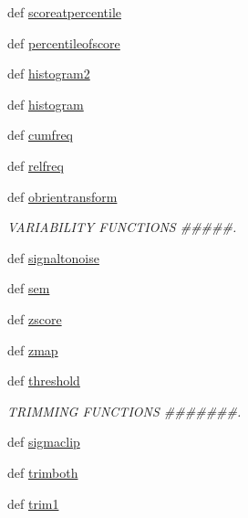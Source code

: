 \begin{DoxyCompactItemize}
def \hyperlink{namespacescipy_1_1stats_1_1stats_a72a6f95981ff8c462388584ecbf1fdb3}{scoreatpercentile}
\item 
def \hyperlink{namespacescipy_1_1stats_1_1stats_a5bfdda61db9243c3bbfea7bead760155}{percentileofscore}
\item 
def \hyperlink{namespacescipy_1_1stats_1_1stats_a8a1c376b310589575a9ff49c01dd573e}{histogram2}
\item 
def \hyperlink{namespacescipy_1_1stats_1_1stats_ad7bf370c4741b90596c8cecb021f2700}{histogram}
\item 
def \hyperlink{namespacescipy_1_1stats_1_1stats_a4fa11e21b0bc19cae7fc92d8a4960462}{cumfreq}
\item 
def \hyperlink{namespacescipy_1_1stats_1_1stats_a651c9a0a2dd7ea81ee73daf3bda40fde}{relfreq}
\item 
def \hyperlink{namespacescipy_1_1stats_1_1stats_a1bd45b2af0f91d4eb96626caf14d2ea3}{obrientransform}
\begin{DoxyCompactList}\small\item\em V\+A\+R\+I\+A\+B\+I\+L\+I\+T\+Y F\+U\+N\+C\+T\+I\+O\+N\+S \#\#\#\#\#. \end{DoxyCompactList}\item 
def \hyperlink{namespacescipy_1_1stats_1_1stats_a7bb1bd5893a4e236fe9c3da20acd31fe}{signaltonoise}
\item 
def \hyperlink{namespacescipy_1_1stats_1_1stats_a60937a31f8ba30ec6197e9a24c124089}{sem}
\item 
def \hyperlink{namespacescipy_1_1stats_1_1stats_afb06bf21578e516d2bc0d9f09e9ce872}{zscore}
\item 
def \hyperlink{namespacescipy_1_1stats_1_1stats_a90bce292719490568f8782fd2e5f4aa8}{zmap}
\item 
def \hyperlink{namespacescipy_1_1stats_1_1stats_ab66a77dd455f02d880db0d592ff92bdd}{threshold}
\begin{DoxyCompactList}\small\item\em T\+R\+I\+M\+M\+I\+N\+G F\+U\+N\+C\+T\+I\+O\+N\+S \#\#\#\#\#\#\#. \end{DoxyCompactList}\item 
def \hyperlink{namespacescipy_1_1stats_1_1stats_a8bc5d99927c5e160441e11270a1be982}{sigmaclip}
\item 
def \hyperlink{namespacescipy_1_1stats_1_1stats_a1354a0d681b70e167d85e50408f58bb7}{trimboth}
\item 
def \hyperlink{namespacescipy_1_1stats_1_1stats_a3bb9cd623c8771cf86301cbbe54dbbab}{trim1}
\item 

\end{DoxyCompactItemize}
